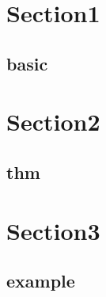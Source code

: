 \section{Section1}
    \subsection{basic}
        

\section{Section2}
    \subsection{thm}
        
        
\section{Section3}
    \subsection{example}
        
